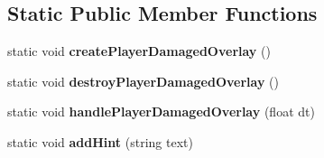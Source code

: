 \subsection*{\-Static \-Public \-Member \-Functions}
\begin{DoxyCompactItemize}
\item 
\hypertarget{classComponentPlayer_ad795da31d48a82f18f03e23ac3c865f6}{
static void {\bfseries create\-Player\-Damaged\-Overlay} ()}
\label{d5/d28/classComponentPlayer_ad795da31d48a82f18f03e23ac3c865f6}

\item 
\hypertarget{classComponentPlayer_a9268a24965814b11a6bfe1751cade0f2}{
static void {\bfseries destroy\-Player\-Damaged\-Overlay} ()}
\label{d5/d28/classComponentPlayer_a9268a24965814b11a6bfe1751cade0f2}

\item 
\hypertarget{classComponentPlayer_a0f455b5d81967c1f2f1c8fa7f9cdd83b}{
static void {\bfseries handle\-Player\-Damaged\-Overlay} (float dt)}
\label{d5/d28/classComponentPlayer_a0f455b5d81967c1f2f1c8fa7f9cdd83b}

\item 
\hypertarget{classComponentPlayer_a1e07540d443c3893d9d5dca814b4d413}{
static void {\bfseries add\-Hint} (string text)}
\label{d5/d28/classComponentPlayer_a1e07540d443c3893d9d5dca814b4d413}

\end{DoxyCompactItemize}
